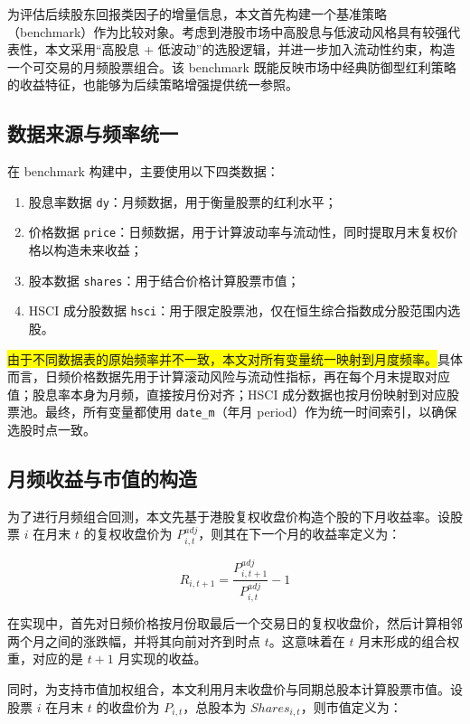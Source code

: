 \documentclass[a4paper,10pt]{article}
\begin{document}
为评估后续股东回报类因子的增量信息，本文首先构建一个基准策略（benchmark）作为比较对象。考虑到港股市场中高股息与低波动风格具有较强代表性，本文采用“高股息 + 低波动”的选股逻辑，并进一步加入流动性约束，构造一个可交易的月频股票组合。该 benchmark 既能反映市场中经典防御型红利策略的收益特征，也能够为后续策略增强提供统一参照。

\subsection{数据来源与频率统一}

在 benchmark 构建中，主要使用以下四类数据：

\begin{enumerate}
    \item 股息率数据 \texttt{dy}：月频数据，用于衡量股票的红利水平；
    \item 价格数据 \texttt{price}：日频数据，用于计算波动率与流动性，同时提取月末复权价格以构造未来收益；
    \item 股本数据 \texttt{shares}：用于结合价格计算股票市值；
    \item HSCI 成分股数据 \texttt{hsci}：用于限定股票池，仅在恒生综合指数成分股范围内选股。
\end{enumerate}

\colorbox{yellow}{由于不同数据表的原始频率并不一致，本文对所有变量统一映射到月度频率。}具体而言，日频价格数据先用于计算滚动风险与流动性指标，再在每个月末提取对应值；股息率本身为月频，直接按月份对齐；HSCI 成分数据也按月份映射到对应股票池。最终，所有变量都使用 \texttt{date\_m}（年月 period）作为统一时间索引，以确保选股时点一致。

\subsection{月频收益与市值的构造}

为了进行月频组合回测，本文先基于港股复权收盘价构造个股的下月收益率。设股票 $i$ 在月末 $t$ 的复权收盘价为 $P_{i,t}^{adj}$，则其在下一个月的收益率定义为：

\begin{equation}
R_{i,t+1} = \frac{P_{i,t+1}^{adj}}{P_{i,t}^{adj}} - 1
\end{equation}

在实现中，首先对日频价格按月份取最后一个交易日的复权收盘价，然后计算相邻两个月之间的涨跌幅，并将其向前对齐到时点 $t$。这意味着在 $t$ 月末形成的组合权重，对应的是 $t+1$ 月实现的收益。

同时，为支持市值加权组合，本文利用月末收盘价与同期总股本计算股票市值。设股票 $i$ 在月末 $t$ 的收盘价为 $P_{i,t}$，总股本为 $Shares_{i,t}$，则市值定义为：
\end{document}
